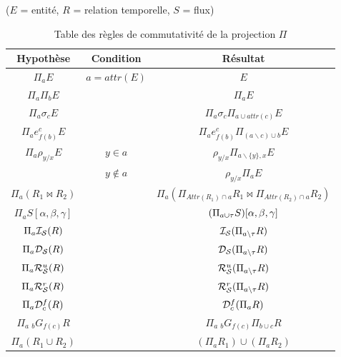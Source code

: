 \begin{table}[p]
\centering
($E$ = entité, $R$ = relation temporelle, $S$ = flux)
\begin{tabular}{|c|c|c|} \bottomrule
\rowcolor{hypcolor} Hypothèse & Condition & Résultat \\ \hline
    $\Pi_a E$ & $a = attr(E)$ & $E$ \\ \hline
    $\Pi_a \Pi_b E$ & & $\Pi_a E$ \\ \hline
    $\Pi_a \sigma_c E$ & &  $\Pi_{a}\sigma_c \Pi_{a\cup attr(c)} E$  \\ \hline
    $\Pi_a e_{f(b)}^c E$ & &  $\Pi_{a} e_{f(b)}^c \Pi_{(a \backslash c)\cup b} E$  \\ \hline
    \multirow{2}{*}{$\Pi_{a} \rho_{y/x} E$} & $y \in a$ & $\rho_{y/x}\Pi_{a\backslash\{y\},x}  E$ \\ \cline{2-3}
    & $y \not\in a$ & $\rho_{y/x}\Pi_{a} E$ \\ \hline
    $\Pi_{a}(R_1\Join R_2)$ & &  $\Pi_{a}(\Pi_{Attr(R_1)\cap a} R_1\Join \Pi_{Attr(R_2)\cap a} R_2)$  \\ \hline
    $\Pi_{a} S[\alpha,\beta,\gamma]$ & &  $(\Pi_{a\cup \tau} S)[\alpha,\beta,\gamma]$  \\ \hline
    $\Pi_{a} \mathcal{I_S}(R)$ &  & $\mathcal{I_S}(\Pi_{a\backslash \tau} R)$ \\ \hline
    $\Pi_{a} \mathcal{D_S}(R)$ &  & $\mathcal{D_S}(\Pi_{a\backslash \tau} R)$ \\ \hline
    $\Pi_{a} \mathcal{R}_{\mathcal S}^{u}(R)$ &  & $\mathcal{R}_{\mathcal S}^{u}(\Pi_{a\backslash \tau} R)$ \\ \hline
    $\Pi_{a} \mathcal{R}_{\mathcal S}^{r}(R)$ & & $\mathcal{R}_{\mathcal S}^{r}(\Pi_{a\backslash \tau} R)$ \\ \hline
    $\Pi_{a} \mathcal{D}_c^f(R)$ & & $\mathcal{D}_c^f(\Pi_{a} R)$ \\ \hline
    $\Pi_{a} \ {}_{b} G_{f(c)} R$ & & $\Pi_{a}\  {}_{b} G_{f(c)}  \Pi_{b \cup c} R$ \\ \hline
    $\Pi_{a} (R_1\cup R_2)$ & &  $(\Pi_{a} R_1)\cup (\Pi_{a} R_2)$  \\ \toprule
\end{tabular}
\caption{Table des règles de commutativité de la projection $\Pi$}\label{tab:projection}
\end{table}
